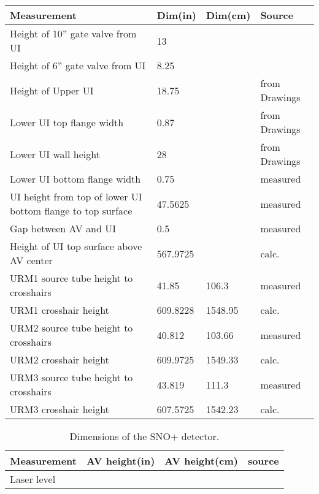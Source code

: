 \begin{table}
  \begin{center}
    \begin{tabular}{llll}
      \hline
      Measurement & Dim(in) & Dim(cm) & Source \\
      \hline
      Height of 10'' gate valve from UI & 13 & & \\
      Height of 6'' gate valve from UI & 8.25 & & \\
      \hline
      Height of Upper UI & 18.75 & & from Drawings\\
      Lower UI top flange width & 0.87 & & from Drawings\\
      Lower UI wall height & 28 & & from Drawings \\
      Lower UI bottom flange width & 0.75 & & measured \\
      UI height from top of lower UI bottom flange to top surface & 47.5625 & & measured \\
      Gap between AV and UI & 0.5 & & measured \\
      Height of UI top surface above AV center & 567.9725 & & calc. \\
      \hline
      URM1 source tube height to crosshairs & 41.85 & 106.3 & measured \\
      URM1 crosshair height & 609.8228 & 1548.95 & calc. \\
      URM2 source tube height to crosshairs & 40.812 & 103.66 & measured \\ 
      URM2 crosshair height & 609.9725 & 1549.33 & calc. \\
      URM3 source tube height to crosshairs & 43.819 & 111.3 & measured \\ 
      URM3 crosshair height & 607.5725 & 1542.23 & calc. \\
      \hline
    \end{tabular}
  \end{center}
  \caption{}
  \label{tab:UIheights}
\end{table}

\begin{table}
  \begin{center}
    \begin{tabular}{llll}
      \hline
      Measurement & AV height(in) & AV height(cm) & source \\
      \hline
      Laser level & & \\
      
      \hline
    \end{tabular}
  \end{center}
  \caption{Dimensions of the SNO+ detector.}
  \label{tab:avpsupmeas}
\end{table}

